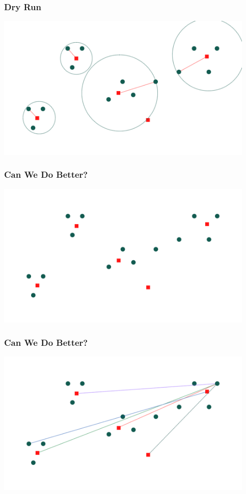 \documentclass{beamer}
\begin{document}
\begin{frame}[c]
    \frametitle{Dry Run}
    \centering \includegraphics[width=350pt]{./12.png}
\end{frame}

\begin{frame}[c]
    \frametitle{Can We Do Better?}
    \centering \includegraphics[width=350pt]{./5.png}
\end{frame}

\begin{frame}[c]
    \frametitle{Can We Do Better?}
    \centering \includegraphics[width=350pt]{./13.png}
\end{frame}
   
\end{document}
